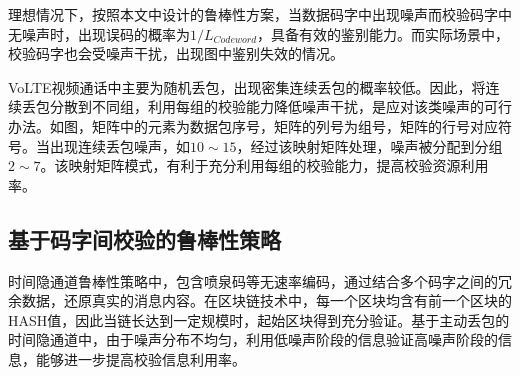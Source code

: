 理想情况下，按照本文中设计的鲁棒性方案，当数据码字中出现噪声而校验码字中无噪声时，出现误码的概率为$1/L_{Codeword}$，具备有效的鉴别能力。而实际场景中，校验码字也会受噪声干扰，出现图中鉴别失效的情况。


VoLTE视频通话中主要为随机丢包，出现密集连续丢包的概率较低。因此，将连续丢包分散到不同组，利用每组的校验能力降低噪声干扰，是应对该类噪声的可行办法。如图，矩阵中的元素为数据包序号，矩阵的列号为组号，矩阵的行号对应符号。当出现连续丢包噪声，如$10\sim 15$，经过该映射矩阵处理，噪声被分配到分组$2\sim 7$。该映射矩阵模式，有利于充分利用每组的校验能力，提高校验资源利用率。

\subsection{基于码字间校验的鲁棒性策略}
\label{chap:hash:motivation:robustness}

时间隐通道鲁棒性策略中，包含喷泉码等无速率编码，通过结合多个码字之间的冗余数据，还原真实的消息内容。在区块链技术中，每一个区块均含有前一个区块的HASH值，因此当链长达到一定规模时，起始区块得到充分验证。基于主动丢包的时间隐通道中，由于噪声分布不均匀，利用低噪声阶段的信息验证高噪声阶段的信息，能够进一步提高校验信息利用率。


